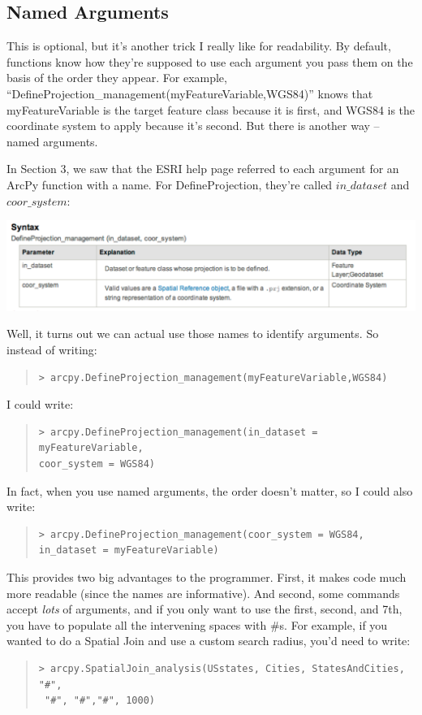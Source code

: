 \documentclass[12pt]{article}
\begin{document}
\subsection*{\textbf{Named Arguments}}
This is optional, but it's another trick I really like for readability. By default, functions know how they're supposed to use each argument you pass them on the basis of the order they appear. For example, ``DefineProjection\_management(myFeatureVariable,WGS84)'' knows that myFeatureVariable is the target feature class because it is first, and WGS84 is the coordinate system to apply because it's second. But there is another way -- named arguments. 

In Section 3, we saw that the ESRI help page referred to each argument for an ArcPy function with a name. For DefineProjection, they're called $in\_dataset$ and $coor\_system$: 

\includegraphics[scale=0.6]{figures/defineprojection.pdf}

Well, it turns out we can actual use those names to identify arguments. So instead of writing: 
\begin{quote}
\begin{verbatim}
> arcpy.DefineProjection_management(myFeatureVariable,WGS84)
\end{verbatim}
\end{quote}
I could write: 
\begin{quote}
\begin{verbatim}
> arcpy.DefineProjection_management(in_dataset = myFeatureVariable, 
coor_system = WGS84)
\end{verbatim}
\end{quote}
In fact, when you use named arguments, the order doesn't matter, so I could also write: 
\begin{quote}
\begin{verbatim}
> arcpy.DefineProjection_management(coor_system = WGS84, 
in_dataset = myFeatureVariable)
\end{verbatim}
\end{quote}

This provides two big advantages to the programmer. First, it makes code much more readable (since the names are informative). And second, some commands accept \emph{lots} of arguments, and if you only want to use the first, second, and 7th, you have to populate all the intervening spaces with $\#$s. For example, if you wanted to do a Spatial Join and use a custom search radius, you'd need to write:
\begin{quote}
\begin{verbatim}
> arcpy.SpatialJoin_analysis(USstates, Cities, StatesAndCities, "#",
 "#", "#","#", 1000)
\end{verbatim}
\end{quote}
\end{document}
